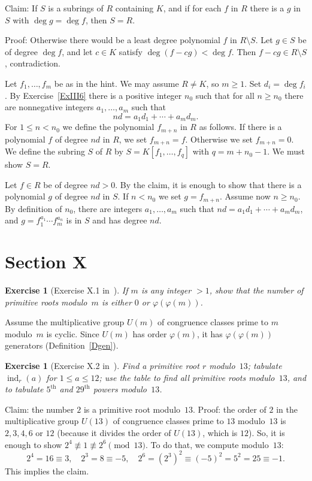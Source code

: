 \documentclass[12pt,letterpaper]{article}
\newtheorem{exer}[thm]{Exercise}
\theoremstyle{definition}
\begin{document}
Claim: If $S$ is a subrings of $R$ containing $K$, and if for each $f$ in $R$ there is a $g$ in $S$ with $\deg g=\deg f$, then $S=R$. 

Proof: Otherwise there would be a least degree polynomial $f$ in $R\setminus S$. Let $g\in S$ be of degree $\deg f$, and let $c\in K$ satisfy $\deg(f-cg)<\deg f$. Then $f-cg\in R\setminus S$, contradiction. 

Let $f_1,\ldots, f_m$ be as in the hint. We may assume $R\ne K$, so $m\ge1$. Set $d_i=\deg f_i$. By Exercise~\ref{ExIII6} there is a positive integer $n_0$ such that for all $n\ge n_0$ there are nonnegative integers $a_1,\ldots, a_m$ such that 
$$
nd=a_1d_1+\cdots+a_md_m.
$$ 
For $1\le n<n_0$ we define the polynomial $f_{m+n}$ in $R$ as follows. If there is a polynomial $f$ of degree $n d$ in $R$, we set $f_{m+n}=f$. Otherwise we set $f_{m+n}=0$. We define the subring $S$ of $R$ by $S=K[f_1,\ldots, f_q]$ with $q=m+n_0-1$. We must show $S=R$. 

Let $f\in R$ be of degree $nd>0$. By the claim, it is enough to show that there is a polynomial $g$ of degree $n d$ in $S$. If $n<n_0$ we set $g=f_{m+n}$. Assume now $n\ge n_0$. By definition of $n_0$, there are integers $a_1,\ldots, a_m$ such that $nd=a_1d_1+\cdots+a_md_m$, and $g=f_1^{a_1}\cdots f_m^{a_n}$ is in $S$ and has degree $nd$. 

\section{Section X} %

\begin{exer}[Exercise X.1 in~\cite{weil1979}]
If $m$ is any integer $>1$, show that the number of primitive roots modulo~$m$ is either $0$ or $\varphi(\varphi(m))$.
\end{exer}

Assume the multiplicative group $U(m)$ of congruence classes prime to $m$ modulo~$m$ is cyclic. Since $U(m)$ has order $\varphi(m)$, it has $\varphi(\varphi(m))$ generators (Definition~\ref{Dgen}). 

\begin{exer}[Exercise X.2 in~\cite{weil1979}]
Find a primitive root $r$ modulo~$13$; tabulate $\operatorname{ind}_r(a)$ for $1\le a\le 12$; use the table to find all primitive roots modulo~$13$, and to tabulate $5^{\text{th}}$ and $29^{\text{th}}$ powers modulo~$13$.
\end{exer}

Claim: the number $2$ is a primitive root modulo~$13$. Proof: the order of $2$ in the multiplicative group $U(13)$ of congruence classes prime to $13$ modulo~$13$ is $2,3,4,6$ or $12$ (because it divides the order of $U(13)$, which is $12$). So, it is enough to show $2^4\not\equiv 1 \not\equiv 2^6 \pmod{13}$. To do that, we compute modulo~$13$: 
$$
2^4=16 \equiv 3,\quad 2^3=8\equiv-5,\quad 2^6=(2^3)^2\equiv(-5)^2=5^2=25\equiv-1.
$$ 
This implies the claim. 
\end{document}
